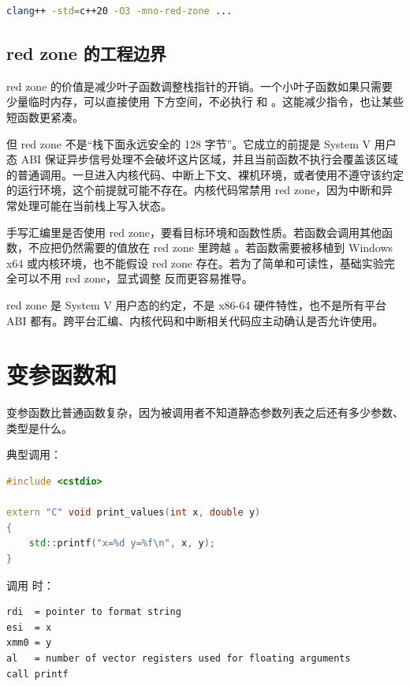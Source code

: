 \begin{lstlisting}[language=bash]
clang++ -std=c++20 -O3 -mno-red-zone ...
\end{lstlisting}

\subsection{red zone 的工程边界}

red zone 的价值是减少叶子函数调整栈指针的开销。一个小叶子函数如果只需要少量临时内存，可以直接使用  下方空间，不必执行  和 。这能减少指令，也让某些短函数更紧凑。

但 red zone 不是“栈下面永远安全的 128 字节”。它成立的前提是 System V 用户态 ABI 保证异步信号处理不会破坏这片区域，并且当前函数不执行会覆盖该区域的普通调用。一旦进入内核代码、中断上下文、裸机环境，或者使用不遵守该约定的运行环境，这个前提就可能不存在。内核代码常禁用 red zone，因为中断和异常处理可能在当前栈上写入状态。

手写汇编里是否使用 red zone，要看目标环境和函数性质。若函数会调用其他函数，不应把仍然需要的值放在 red zone 里跨越 。若函数需要被移植到 Windows x64 或内核环境，也不能假设 red zone 存在。若为了简单和可读性，基础实验完全可以不用 red zone，显式调整  反而更容易推导。

\begin{warningbox}
red zone 是 System V 用户态的约定，不是 x86-64 硬件特性，也不是所有平台 ABI 都有。跨平台汇编、内核代码和中断相关代码应主动确认是否允许使用。
\end{warningbox}

\section{变参函数和 }

变参函数比普通函数复杂，因为被调用者不知道静态参数列表之后还有多少参数、类型是什么。

典型调用：

\begin{lstlisting}[language=C++]
#include <cstdio>

extern "C" void print_values(int x, double y)
{
    std::printf("x=%d y=%f\n", x, y);
}
\end{lstlisting}

调用  时：

\begin{lstlisting}
rdi  = pointer to format string
esi  = x
xmm0 = y
al   = number of vector registers used for floating arguments
call printf
\end{lstlisting}

